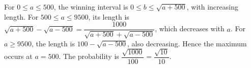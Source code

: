 For $0\le a\le500$, the winning interval is $0\le b\le\sqrt{a+500}$, with increasing length. For $500\le a\le9500$, its length is $\sqrt{a+500}-\sqrt{a-500}=\dfrac{1000}{\sqrt{a+500}+\sqrt{a-500}}$, which decreases with $a$. For $a\ge9500$, the length is $100-\sqrt{a-500}$, also decreasing. Hence the maximum occurs at $\boxed{a=500}$. The probability is $\dfrac{\sqrt{1000}}{100}=\boxed{\dfrac{\sqrt{10}}{10}}$.
